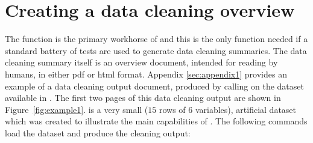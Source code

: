 \documentclass[article,shortnames]{jss}
\newcommand{\hl}[1]{\textcolor{magenta}{#1}}
\newcommand{\R}[1]{\code{#1}}
\begin{document}





\section{Creating a data cleaning overview}
\label{sec:usingdataMaid}

The  function is the primary workhorse of  and
this is the only function needed if a standard battery
of tests are used to generate data cleaning summaries. The data
cleaning summary itself is an overview document, intended for reading
by humans, in either pdf or html format. Appendix \ref{sec:appendix1}
provides an example of a data cleaning output document, produced by
calling  on the dataset  available in
. The first two pages of this data cleaning output are
shown in Figure~\ref{fig:example1}.  is a very
small ($15$ rows of $6$ variables), artificial dataset which was created to
illustrate the main capabilities of . The following
commands load the dataset and produce the cleaning output:
\end{document}
